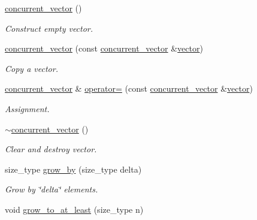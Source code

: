 \begin{DoxyCompactItemize}
\item 
\hypertarget{classtbb_1_1concurrent__vector_af978f34536e3ef6977dfb25b58678982}{}\hyperlink{classtbb_1_1concurrent__vector_af978f34536e3ef6977dfb25b58678982}{concurrent\+\_\+vector} ()\label{classtbb_1_1concurrent__vector_af978f34536e3ef6977dfb25b58678982}

\begin{DoxyCompactList}\small\item\em Construct empty vector. \end{DoxyCompactList}\item 
\hypertarget{classtbb_1_1concurrent__vector_a3be0cedce204c8035feed42cdb981db8}{}\hyperlink{classtbb_1_1concurrent__vector_a3be0cedce204c8035feed42cdb981db8}{concurrent\+\_\+vector} (const \hyperlink{classtbb_1_1concurrent__vector}{concurrent\+\_\+vector} \&\hyperlink{structvector}{vector})\label{classtbb_1_1concurrent__vector_a3be0cedce204c8035feed42cdb981db8}

\begin{DoxyCompactList}\small\item\em Copy a vector. \end{DoxyCompactList}\item 
\hypertarget{classtbb_1_1concurrent__vector_a61eb15b454034c9ec9c912dd0dd2ad4b}{}\hyperlink{classtbb_1_1concurrent__vector}{concurrent\+\_\+vector} \& \hyperlink{classtbb_1_1concurrent__vector_a61eb15b454034c9ec9c912dd0dd2ad4b}{operator=} (const \hyperlink{classtbb_1_1concurrent__vector}{concurrent\+\_\+vector} \&\hyperlink{structvector}{vector})\label{classtbb_1_1concurrent__vector_a61eb15b454034c9ec9c912dd0dd2ad4b}

\begin{DoxyCompactList}\small\item\em Assignment. \end{DoxyCompactList}\item 
\hypertarget{classtbb_1_1concurrent__vector_ac2290bb646044670b1808418210ddcf8}{}\hyperlink{classtbb_1_1concurrent__vector_ac2290bb646044670b1808418210ddcf8}{$\sim$concurrent\+\_\+vector} ()\label{classtbb_1_1concurrent__vector_ac2290bb646044670b1808418210ddcf8}

\begin{DoxyCompactList}\small\item\em Clear and destroy vector. \end{DoxyCompactList}\item 
size\+\_\+type \hyperlink{classtbb_1_1concurrent__vector_ae1fb39ffbfa1650cecfbc3aafcecfc8b}{grow\+\_\+by} (size\+\_\+type delta)
\begin{DoxyCompactList}\small\item\em Grow by \char`\"{}delta\char`\"{} elements. \end{DoxyCompactList}\item 
\hypertarget{classtbb_1_1concurrent__vector_a34c9b4206eb6574a1e752450fb60deba}{}void \hyperlink{classtbb_1_1concurrent__vector_a34c9b4206eb6574a1e752450fb60deba}{grow\+\_\+to\+\_\+at\+\_\+least} (size\+\_\+type n)\label{classtbb_1_1concurrent__vector_a34c9b4206eb6574a1e752450fb60deba}


\end{DoxyCompactItemize}
